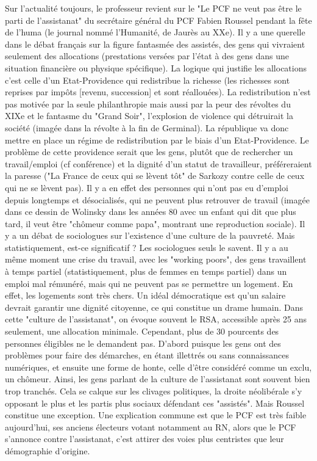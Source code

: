 \documentclass[a4paper,12pt]{book}
\begin{document}
\par Sur l'actualité toujours, le professeur revient sur le "Le PCF ne veut pas être le parti de l'assistanat" du secrétaire général du PCF Fabien Roussel pendant la fête de l'huma (le journal nommé l'Humanité, de Jaurès au XXe). Il y a une querelle dans le débat français sur la figure fantasmée des assistés, des gens qui vivraient seulement des allocations (prestations versées par l'état à des gens dans une situation financière ou physique spécifique). La logique qui justifie les allocations c'est celle d'un Etat-Providence qui redistribue la richesse (les richesses sont reprises par impôts [revenu, succession] et sont réallouées). La redistribution n'est pas motivée par la seule philanthropie mais aussi par la peur des révoltes du XIXe et le fantasme du "Grand Soir", l'explosion de violence qui détruirait la société (imagée dans la révolte à la fin de Germinal). La république va donc mettre en place un régime de redistribution par le biais d'un Etat-Providence. Le problème de cette providence serait que les gens, plutôt que de rechercher un travail/emploi (cf conférence) et la dignité d'un statut de travailleur, préféreraient la paresse ("La France de ceux qui se lèvent tôt" de Sarkozy contre celle de ceux qui ne se lèvent pas). Il y a en effet des personnes qui n'ont pas eu d'emploi depuis longtemps et désocialisés, qui ne peuvent plus retrouver de travail (imagée dans ce dessin de Wolinsky dans les années 80 avec un enfant qui dit que plus tard, il veut être "chômeur comme papa", montrant une reproduction sociale). Il y a un débat de sociologues sur l'existence d'une culture de la pauvreté. Mais statistiquement, est-ce significatif ? Les sociologues seuls le savent. Il y a au même moment une crise du travail, avec les "working poors", des gens travaillent à temps partiel (statistiquement, plus de femmes en temps partiel) dans un emploi mal rémunéré, mais qui ne peuvent pas se permettre un logement. En effet, les logements sont très chers. Un idéal démocratique est qu'un salaire devrait garantir une dignité citoyenne, ce qui constitue un drame humain. Dans cette "culture de l'assistanat", on évoque souvent le RSA, accessible après 25 ans seulement, une allocation minimale. Cependant, plus de 30 pourcents des personnes éligibles ne le demandent pas. D'abord puisque les gens ont des problèmes pour faire des démarches, en étant illettrés ou sans connaissances numériques, et ensuite une forme de honte, celle d'être considéré comme un exclu, un chômeur. Ainsi, les gens parlant de la culture de l'assistanat sont souvent bien trop tranchés. Cela se calque sur les clivages politiques, la droite néolibérale s'y opposant le plus et les partis plus sociaux défendant ces "assistés". Mais Roussel constitue une exception. Une explication commune est que le PCF est très faible aujourd'hui, ses anciens électeurs votant notamment au RN, alors que le PCF s'annonce contre l'assistanat, c'est attirer des voies plus centristes que leur démographie d'origine.
\end{document}
